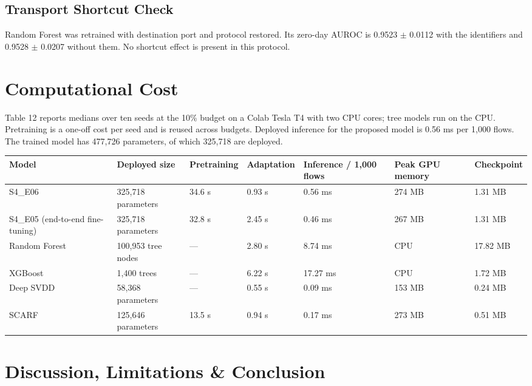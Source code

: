 \documentclass[10pt,a4paper]{article}
\begin{document}
\subsection{Transport Shortcut Check}
Random Forest was retrained with destination port and protocol restored. Its zero-day AUROC is 0.9523 $\pm$ 0.0112 with the identifiers and 0.9528 $\pm$ 0.0207 without them. No shortcut effect is present in this protocol.

\section{Computational Cost}
Table 12 reports medians over ten seeds at the 10\% budget on a Colab Tesla T4 with two CPU cores; tree models run on the CPU. Pretraining is a one-off cost per seed and is reused across budgets. Deployed inference for the proposed model is 0.56 ms per 1,000 flows. The trained model has 477,726 parameters, of which 325,718 are deployed.

\begin{center}
\begin{adjustbox}{max width=\linewidth}\small
\begin{tabular}{lllllll}
\toprule
{\bfseries\boldmath Model} & {\bfseries\boldmath Deployed size} & {\bfseries\boldmath Pretraining} & {\bfseries\boldmath Adaptation} & {\bfseries\boldmath Inference / 1,000 flows} & {\bfseries\boldmath Peak GPU memory} & {\bfseries\boldmath Checkpoint} \\
\midrule
S4\_E06 & 325,718 parameters & 34.6 s & 0.93 s & 0.56 ms & 274 MB & 1.31 MB \\
S4\_E05 (end-to-end fine-tuning) & 325,718 parameters & 32.8 s & 2.45 s & 0.46 ms & 267 MB & 1.31 MB \\
Random Forest & 100,953 tree nodes & --- & 2.80 s & 8.74 ms & CPU & 17.82 MB \\
XGBoost & 1,400 trees & --- & 6.22 s & 17.27 ms & CPU & 1.72 MB \\
Deep SVDD & 58,368 parameters & --- & 0.55 s & 0.09 ms & 153 MB & 0.24 MB \\
SCARF & 125,646 parameters & 13.5 s & 0.94 s & 0.17 ms & 273 MB & 0.51 MB \\
\bottomrule
\end{tabular}
\end{adjustbox}
\end{center}
\section{Discussion, Limitations \& Conclusion}
\end{document}
